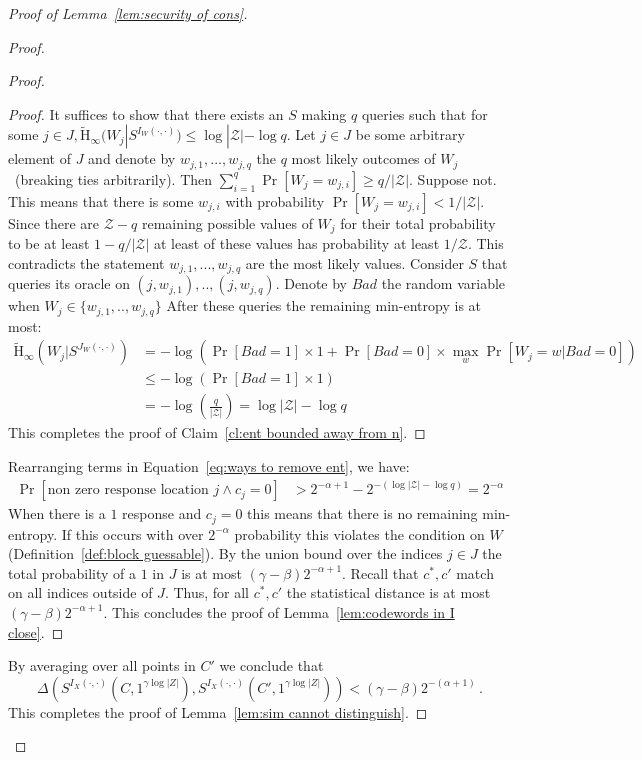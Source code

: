 \documentclass[11pt]{article}
\newcommand{\defref}[1]{\mbox{Definition~\ref{#1}}}
\newcommand{\lemref}[1]{\mbox{Lemma~\ref{#1}}}
\newcommand{\clref}[1]{\mbox{Claim~\ref{#1}}}
\newcommand{\Hav}{\tilde{\mathrm{H}}_\infty}
\begin{document}
\begin{proof}[Proof of \lemref{lem:security of cons}]
\begin{proof}
\begin{proof}
\begin{proof}
It suffices to show that there exists an $S$ making $q$ queries such that for some $j\in J, \Hav(W_j | S^{I_{W}(\cdot, \cdot)})\le \log |\mathcal{Z}| - \log q$.  Let $j\in J$ be some arbitrary element of $J$ and denote by $w_{j,1}, ..., w_{j,q}$ the $q$ most likely outcomes of $W_j$~(breaking ties arbitrarily).  Then $\sum_{i=1}^q \Pr[W_j = w_{j,i}]\geq q/|\mathcal{Z}|$.  Suppose not. This means that there is some $w_{j,i}$ with probability $\Pr[W_j = w_{j,i}] < 1/|\mathcal{Z}|$.  Since there are $\mathcal{Z} - q $ remaining possible values of $W_j$ for their total probability to be at least $1-q/|\mathcal{Z}|$ at least of these values has probability at least $1/\mathcal{Z}$.  This contradicts the statement $w_{j,1},..., w_{j,q}$ are the most likely values.  Consider $S$ that queries its oracle on $(j, w_{j,1}),.., (j, w_{j,q})$.  Denote by $Bad$ the random variable when $W_j\in \{w_{j,1},.., w_{j,q}\}$  After these queries the remaining min-entropy is at most:
\begin{align*}
\Hav(W_j | S^{J_W(\cdot, \cdot)}) &=  -\log \left(\Pr[Bad=1]\times 1+ \Pr[Bad=0]\times \max_{w}\Pr[W_j = w| Bad =0]\right)\\
&\leq  -\log \left(\Pr[Bad=1]\times 1\right)\\
&=-\log\left( \frac{q}{|\mathcal{Z}|} \right) = \log|\mathcal{Z}|-\log q
\end{align*}
This completes the proof of \clref{cl:ent bounded away from n}.
\end{proof}
\noindent
Rearranging terms in Equation~\ref{eq:ways to remove ent}, we have:
\begin{align*}
 \Pr[\text{non zero response location }j \wedge c_j=0] &>2^{-\alpha+1} - 2^{-(\log |\mathcal{Z}|-\log q)}=  2^{-\alpha}
 \end{align*}
 When there is a $1$ response and $c_j=0$ this means that there is no remaining min-entropy.  If this occurs with over $2^{-\alpha}$ probability this violates the condition on $W$ (\defref{def:block guessable}).  By the union bound over the indices $j\in J$ the total probability of a $1$ in $J$ is at most $(\gamma-\beta)2^{-\alpha+1}$. Recall that $c^*, c'$ match on all indices outside of $J$. Thus, for all $c^*, c'$ the statistical distance is at most $(\gamma- \beta)2^{-\alpha+1}$.  This concludes the proof of \lemref{lem:codewords in I close}.
\end{proof}
By averaging over all points in $C'$ we conclude that 
\[
\Delta(S^{I_X(\cdot, \cdot)}(C, 1^{\gamma \log |Z|}), S^{I_X(\cdot, \cdot)}(C', 1^{\gamma \log |Z|})) < (\gamma -\beta)2^{-(\alpha+1)}\,.
\]
This completes the proof of \lemref{lem:sim cannot distinguish}.
\end{proof}


\end{proof}
\end{document}
